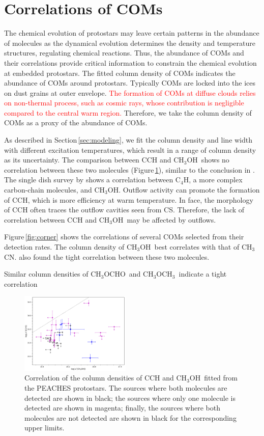\documentclass[twocolumn]{aastex62}
\newcommand{\methylformate}{\mbox{CH$_{3}$OCHO}}
\newcommand{\methanol}{\mbox{CH$_{3}$OH}}
\newcommand{\dimethylether}{\mbox{CH$_{3}$OCH$_{3}$}}
\newcommand{\methylcyanide}{\mbox{CH$_{3}$CN}}
\begin{document}
\section{Correlations of COMs}
The chemical evolution of protostars may leave certain patterns in the abundance of molecules as the dynamical evolution determines the density and temperature structures, regulating chemical reactions.  Thus, the abundance of COMs and their correlations provide critical information to constrain the chemical evolution at embedded protostars.  The fitted column density of COMs indicates the abundance of COMs around protostars.  Typically COMs are locked into the ices on dust grains at outer envelope.  \textcolor{red}{The formation of COMs at diffuse clouds relies on non-thermal process, such as cosmic rays, whose contribution is negligible compared to the central warm region.}  Therefore, we take the column density of COMs as a proxy of the abundance of COMs.  

As described in Section\,\ref{sec:modeling}, we fit the column density and line width with different excitation temperatures, which result in a range of column density as its uncertainty.  The comparison between CCH and \methanol\ shows no correlation between these two molecules (Figure\,\ref{fig:cch_ch3oh}), similar to the conclusion in \citet{2018ApJS..236...52H}.  The single dish survey by \citet{2016ApJ...833..125G} shows a correlation between C$_{4}$H, a more complex carbon-chain molecules, and \methanol.  Outflow activity can promote the formation of CCH, which is more efficiency at warm temperature.  In face, the morphology of CCH often traces the outflow cavities seen from CS.  Therefore, the lack of correlation between CCH and \methanol\ may be affected by outflows.

Figure\,\ref{fig:corner} shows the correlations of several COMs selected from their detection rates.  The column density of \methanol\ best correlates with that of \methylcyanide.  \citet{2020A&A...635A.198B} also found the tight correlation between these two molecules.  

Similar column densities of \methylformate\ and \dimethylether\ indicate a tight correlation


\begin{figure}[htbp!]
  \centering
  \includegraphics[width=0.47\textwidth]{Ncol_ch3oh_cch.pdf}
  \caption{Correlation of the column densities of CCH and \methanol\ fitted from the PEACHES protostars.  The sources where both molecules are detected are shown in black; the sources where only one molecule is detected are shown in magenta; finally, the sources where both molecules are not detected are shown in black for the corresponding upper limits.}
  \label{fig:cch_ch3oh}
\end{figure}
\end{document}
